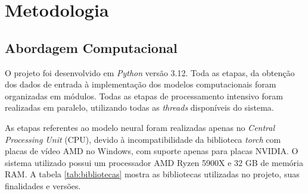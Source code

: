 \chapter{Metodologia} %
\section{Abordagem Computacional} %

O projeto foi desenvolvido em \textit{Python} versão 3.12. Toda as etapas, da obtenção dos dados de entrada à implementação
dos modelos computacionais foram organizadas em módulos. Todas as etapas de processamento intensivo foram realizadas em
paralelo, utilizando todas as \textit{threads} disponíveis do sistema. 

As etapas referentes ao modelo neural foram realizadas apenas no \textit{Central Processing Unit} (CPU), devido à
incompatibilidade da biblioteca \textit{torch} com placas de vídeo AMD no Windows, com suporte apenas para placas NVIDIA.
O sistema utilizado possui um processador AMD Ryzen 5900X e 32 GB de memória RAM. A tabela \ref{tab:bibliotecas} mostra 
as bibliotecas utilizadas no projeto, suas finalidades e versões.

\begin{table}[htb]
  \centering
\end{table}

